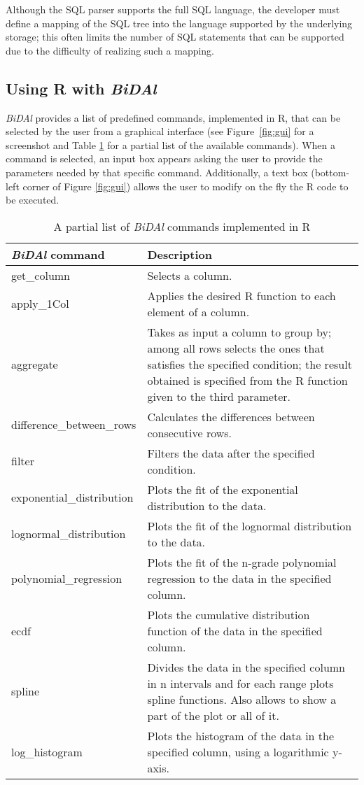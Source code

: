 \documentclass{article}
\begin{document}
Although the SQL parser supports the full SQL language, the developer must define a mapping of the SQL tree into the language supported by the underlying storage; this often limits the number of SQL statements that can be supported due to the difficulty of realizing such a mapping.

\subsection{Using R with \emph{BiDAl} }



\emph{BiDAl}  provides a list of predefined commands, implemented in R, that can be selected by the user from a graphical interface (see Figure~\ref{fig:gui} for a screenshot and Table \ref{tab:comm} for a partial list of the available commands). When a command is selected, an input box appears asking the user to provide the parameters needed by that specific command. Additionally, a text box (bottom-left corner of Figure \ref{fig:gui}) allows the user to modify on the fly the R code to be executed. 


\begin{table}
\begin{tabular}{|p{3.5cm} p{8cm}|}
\hline {\bf \emph{BiDAl} command} & {\bf Description}   \\
\hline\hline
get\_column&Selects a column.\\
\hline
apply\_1Col&Applies the desired R function to each element of a column.\\
\hline
aggregate&Takes as input a column to group by; among all rows selects the ones that satisfies the specified condition; the result obtained is specified from the R function given to the third parameter.\\
\hline
difference\_between\_rows&Calculates the differences between consecutive rows.\\
\hline
filter&Filters the data after the specified condition.\\
\hline
exponential\_distribution&Plots the fit of the exponential distribution to the data.\\
\hline
lognormal\_distribution&Plots the fit of the lognormal distribution to the data.\\
\hline
polynomial\_regression&Plots the fit of the n-grade polynomial regression to the data in the specified column.\\
\hline
ecdf&Plots the cumulative distribution function of the data in the specified column.\\
\hline
spline&Divides the data in the specified column in n intervals and for each range plots spline functions. Also allows to show a part of the plot or all of it.\\
\hline
log\_histogram&Plots the histogram of the data in the specified column, using a logarithmic y-axis. \\
\hline
\end{tabular}
\caption{A partial list of \emph{BiDAl} commands implemented in R}
\label{tab:comm}     
\end{table}
\end{document}
